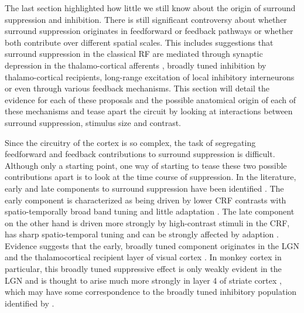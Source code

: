 The last section highlighted how little we still know about the origin
of surround suppression and inhibition. There is still significant
controversy about whether surround suppression originates in feedforward or
feedback pathways or whether both contribute over different spatial
scales. This includes suggestions that surround suppression in the
classical RF are mediated through synaptic depression in the
thalamo-cortical afferents \citep{Carandini2002}, broadly tuned
inhibition by thalamo-cortical recipients, long-range excitation of
local inhibitory interneurons or even through various feedback
mechanisms. This section will detail the evidence for each of these
proposals and the possible anatomical origin of each of these mechanisms
and tease apart the circuit by looking at interactions between
surround suppression, stimulus size and contrast.

Since the circuitry of the cortex is so complex, the task of
segregating feedforward and feedback contributions to surround
suppression is difficult. Although only a starting point, one way of
starting to tease these two possible contributions apart is to look at
the time course of suppression. In the literature, early and late
components to surround suppression have been identified
\citep{Webb2005}. The early component is characterized as being driven
by lower CRF contrasts with spatio-temporally broad band tuning and
little adaptation \citep{Levitt1997,Cavanaugh2002a}. The late
component on the other hand is driven more strongly by high-contrast
stimuli in the CRF, has sharp spatio-temporal tuning and can be
strongly affected by adaption \citep{Levitt1997}. Evidence suggests
that the early, broadly tuned component originates in the LGN and the
thalamocortical recipient layer of visual cortex
\citep{Blasdel1984a,Hawken1996}. In monkey cortex in particular, this
broadly tuned suppressive effect is only weakly evident in the LGN and
is thought to arise much more strongly in layer 4 of striate cortex
\citep{Webb2005}, which may have some correspondence to the broadly
tuned inhibitory population identified by \cite{Hirsch2003}.


